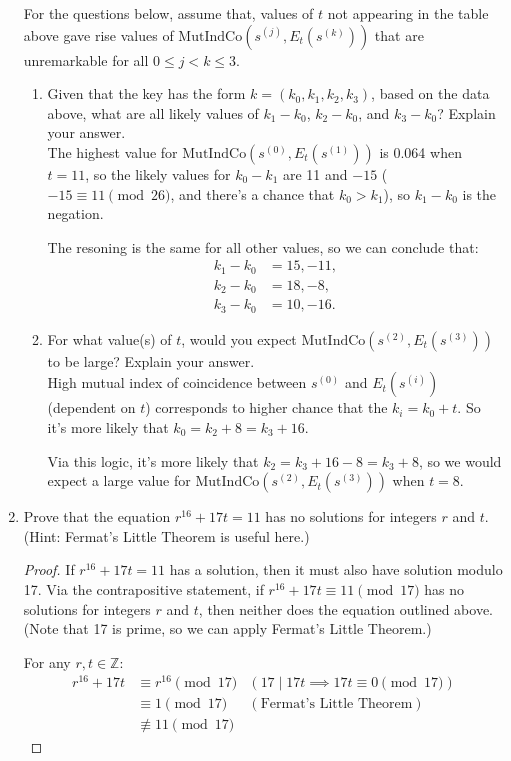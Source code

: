 \documentclass[11pt]{article}
\newcommand{\Z}{\mathbb{Z}}
\newcommand{\n}{\vspace{0.3cm}}
\begin{document}
\begin{enumerate}
For the questions below, assume that,  values of $t$ not appearing in the table above gave rise values of $\mathrm{MutIndCo}(s^{(j)},E_t(s^{(k)}))$ that are unremarkable for all $0 \leq j<k \leq 3$.
\begin{enumerate}
\item Given that the key has the form $k = (k_0, k_1, k_2,k_3)$, based on the data above, what are all likely values of $k_1-k_0$, $k_2-k_0$, and $k_3-k_0$? Explain your answer. \n\\
  The highest value for \(\mathrm{MutIndCo}(s^{(0)},E_t(s^{{(1)}}))\) is 0.064 when \(t=11\), so the likely values for \(k_0-k_1\) are 11 and \(-15\) (\(-15 \equiv 11 \pmod{26}\), and there's a chance that \(k_0 > k_1\)), so \(k_1 - k_0\) is the negation. \n

  The resoning is the same for all other values, so we can conclude that:
  \begin{align*}
    k_1 - k_0 &= 15,-11, \\
    k_2 - k_0 &= 18,-8, \\
    k_3 - k_0 &= 10,-16.
  \end{align*}

\item  For what value(s) of $t$, would you expect $\mathrm{MutIndCo}(s^{(2)},E_t(s^{(3)}))$ to be large? Explain your answer. \n\\
  High mutual index of coincidence between \(s^{(0)}\) and \(E_t(s^{{(i)}})\) (dependent on \(t\)) corresponds to higher chance that the \(k_i = k_0 + t\).  So it's more likely that \(k_0 = k_2 + 8 = k_3 + 16\). \n

  Via this logic, it's more likely that \(k_2 = k_3 + 16 - 8 = k_3 + 8\), so we would expect a large value for \(\mathrm{MutIndCo}(s^{(2)},E_t(s^{(3)}))\) when \(t=8\).
\end{enumerate} \n

\item Prove that the equation $r^{16}+17t=11$ has no solutions for integers $r$ and $t$.  (Hint: Fermat's Little Theorem is useful here.)
  \begin{proof}
    If \(r^{16} + 17t = 11\) has a solution, then it must also have solution modulo 17.  Via the contrapositive statement, if \(r^{16} + 17t \equiv 11 \pmod{17}\) has no solutions for integers \(r\) and \(t\), then neither does the equation outlined above. (Note that 17 is prime, so we can apply Fermat's Little Theorem.)

    For any \(r,t \in \Z\):
    \begin{align*}
      r^{16} + 17t &\equiv r^{16} \pmod{17} & (17 \mid 17t \implies 17t \equiv 0 \pmod{17}) \\
                   &\equiv 1 \pmod{17} & (\text{Fermat's Little Theorem}) \\
                   &\not\equiv 11 \pmod{17}
    \end{align*}


\end{proof}
\end{enumerate}
\end{document}
